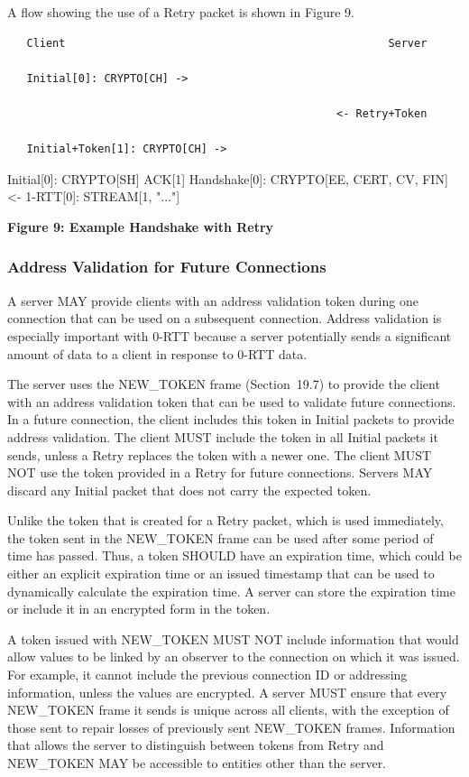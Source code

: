 \documentclass{article}
\begin{document}
A flow showing the use of a Retry packet is shown in Figure 9.

\begin{verbatim}
   Client                                                  Server

   Initial[0]: CRYPTO[CH] ->

                                                   <- Retry+Token

   Initial+Token[1]: CRYPTO[CH] ->
\end{verbatim}

Initial[0]: CRYPTO[SH] ACK[1] Handshake[0]: CRYPTO[EE, CERT, CV, FIN] <- 1-RTT[0]: STREAM[1, "..."]

\begin{center}
\textbf{Figure 9: Example Handshake with Retry}
\end{center}

\subsubsection{Address Validation for Future Connections}

A server MAY provide clients with an address validation token during one connection that can be used on a subsequent connection.  Address validation is especially important with 0-RTT because a server potentially sends a significant amount of data to a client in response to 0-RTT data.

The server uses the NEW\_TOKEN frame (Section~19.7) to provide the client with an address validation token that can be used to validate future connections.  In a future connection, the client includes this token in Initial packets to provide address validation.  The client MUST include the token in all Initial packets it sends, unless a Retry replaces the token with a newer one.  The client MUST NOT use the token provided in a Retry for future connections.  Servers MAY discard any Initial packet that does not carry the expected token.

Unlike the token that is created for a Retry packet, which is used immediately, the token sent in the NEW\_TOKEN frame can be used after some period of time has passed.  Thus, a token SHOULD have an expiration time, which could be either an explicit expiration time or an issued timestamp that can be used to dynamically calculate the expiration time.  A server can store the expiration time or include it in an encrypted form in the token.

A token issued with NEW\_TOKEN MUST NOT include information that would allow values to be linked by an observer to the connection on which it was issued.  For example, it cannot include the previous connection ID or addressing information, unless the values are encrypted.  A server MUST ensure that every NEW\_TOKEN frame it sends is unique across all clients, with the exception of those sent to repair losses of previously sent NEW\_TOKEN frames.  Information that allows the server to distinguish between tokens from Retry and NEW\_TOKEN MAY be accessible to entities other than the server.
\end{document}
